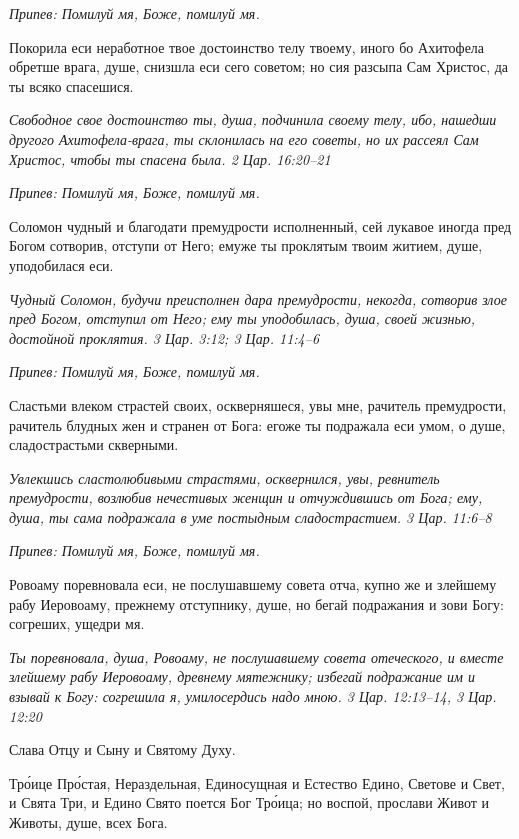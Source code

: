 \itshape Припев:\normalfont{} Помилуй мя, Боже, помилуй мя.


Покорила еси неработное твое достоинство телу твоему, иного бо Ахитофела обретше врага, душе, снизшла еси сего советом; но сия разсыпа Сам Христос, да ты всяко спасешися.


\itshape Свободное свое достоинство ты, душа, подчинила своему телу, ибо, нашедши другого Ахитофела-врага, ты склонилась на его советы, но их рассеял Сам Христос, чтобы ты спасена была. 2 Цар. 16:20–21\normalfont{}


\itshape Припев:\normalfont{} Помилуй мя, Боже, помилуй мя.


Соломон чудный и благодати премудрости исполненный, сей лукавое иногда пред Богом сотворив, отступи от Него; емуже ты проклятым твоим житием, душе, уподобилася еси.


\itshape Чудный Соломон, будучи преисполнен дара премудрости, некогда, сотворив злое пред Богом, отступил от Него; ему ты уподобилась, душа, своей жизнью, достойной проклятия. 3 Цар. 3:12; 3 Цар. 11:4–6\normalfont{}


\itshape Припев:\normalfont{} Помилуй мя, Боже, помилуй мя.


Сластьми влеком страстей своих, оскверняшеся, увы мне, рачитель премудрости, рачитель блудных жен и странен от Бога: егоже ты подражала еси умом, о душе, сладострастьми скверными.


\itshape Увлекшись сластолюбивыми страстями, осквернился, увы, ревнитель премудрости, возлюбив нечестивых женщин и отчуждившись от Бога; ему, душа, ты сама подражала в уме постыдным сладострастием. 3 Цар. 11:6–8\normalfont{}


\itshape Припев:\normalfont{} Помилуй мя, Боже, помилуй мя.


Ровоаму поревновала еси, не послушавшему совета отча, купно же и злейшему рабу Иеровоаму, прежнему отступнику, душе, но бегай подражания и зови Богу: согреших, ущедри мя.


\itshape Ты поревновала, душа, Ровоаму, не послушавшему совета отеческого, и вместе злейшему рабу Иеровоаму, древнему мятежнику; избегай подражание им и взывай к Богу: согрешила я, умилосердись надо мною. 3 Цар. 12:13–14, 3 Цар. 12:20\normalfont{}


Слава Отцу и Сыну и Святому Духу.


Тро́ице Про́стая, Нераздельная, Единосущная и Естество Едино, Светове и Свет, и Свята Три, и Едино Свято поется Бог Тро́ица; но воспой, прослави Живот и Животы, душе, всех Бога.


